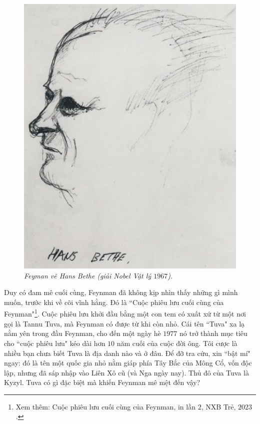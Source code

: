 \begin{multicols}{2}
	\begin{figure}[H]
			\vspace*{-5pt}
			\centering
			\captionsetup{labelformat= empty, justification=centering}
			\includegraphics[width= 1\linewidth]{3a}
			\caption{\small\textit{\color{quantoan}Feyman vẽ Hans Bethe (giải Nobel Vật lý $1967$).}}
			\vspace*{-10pt}
		\end{figure}
	Duy có đam mê cuối cùng, Feynman đã không kịp nhìn thấy những gì mình muốn, trước khi về cõi vĩnh hằng. Đó là ``Cuộc phiêu lưu cuối cùng của Feynman"\footnote[2]{\color{quantoan}Xem thêm: Cuộc phiêu lưu cuối cùng của Feynman, in lần $2$, NXB Trẻ, $2023$.}. Cuộc phiêu lưu khởi đầu bằng một con tem có xuất xứ từ một nơi gọi là Tannu Tuva, mà Feynman có được từ khi còn nhỏ. Cái tên ``Tuva" xa lạ nằm yên trong đầu Feynman, cho đến một ngày hè $1977$ nó trở thành mục tiêu cho ``cuộc phiêu lưu" kéo dài hơn $10$ năm cuối của cuộc đời ông. Tôi cược là nhiều bạn chưa biết Tuva là địa danh nào và ở đâu. Để đỡ tra cứu, xin ``bật mí" ngay: đó là tên một quốc gia nhỏ nằm giáp phía Tây Bắc của Mông Cổ, vốn độc lập, nhưng đã sáp nhập vào Liên Xô cũ (và Nga ngày nay). Thủ đô của Tuva là Kyzyl. Tuva có gì đặc biệt mà khiến Feynman mê mệt đến vậy?

\end{multicols}
